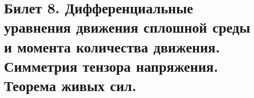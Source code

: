 \newpage
\section{Билет 8. Дифференциальные уравнения движения сплошной среды и момента количества движения. Симметрия тензора напряжения. Теорема живых сил.}
